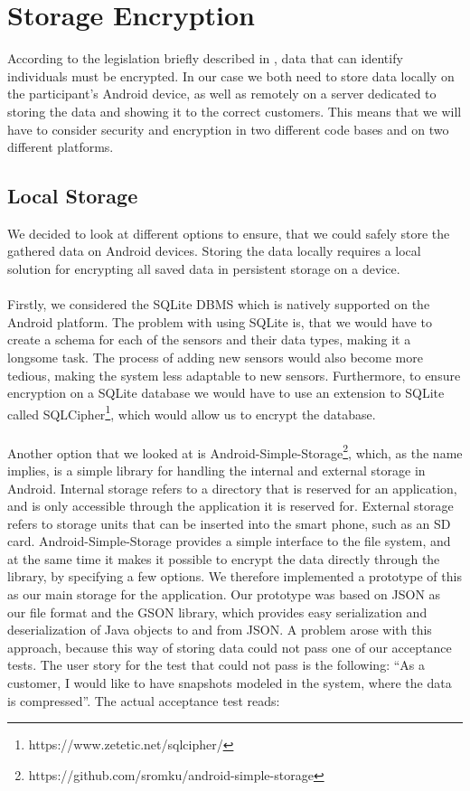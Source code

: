 
\section{Storage Encryption}
\label{sec:storage_encryption}
According to the legislation briefly described in , data that can identify individuals must be encrypted. In our case we both need to store data locally on the participant's Android device, as well as remotely on a server dedicated to storing the data and showing it to the correct customers. This means that we will have to consider security and encryption in two different code bases and on two different platforms. 

\subsection{Local Storage}
\label{sub:local_storage}
We decided to look at different options to ensure, that we could safely store the gathered data on Android devices. Storing the data locally requires a local solution for encrypting all saved data in persistent storage on a device. 
\\\\
Firstly, we considered the SQLite DBMS which is natively supported on the Android platform. The problem with using SQLite is, that we would have to create a schema for each of the sensors and their data types, making it a longsome task. The process of adding new sensors would also become more tedious, making the system less adaptable to new sensors. Furthermore, to ensure encryption on a SQLite database we would have to use an extension to SQLite called SQLCipher\footnote{https://www.zetetic.net/sqlcipher/}, which would allow us to encrypt the database. 
\\\\
Another option that we looked at is Android-Simple-Storage\footnote{https://github.com/sromku/android-simple-storage}, which, as the name implies, is a simple library for handling the internal and external storage in Android. Internal storage refers to a directory that is reserved for an application, and is only accessible through the application it is reserved for. External storage refers to storage units that can be inserted into the smart phone, such as an SD card. Android-Simple-Storage provides a simple interface to the file system, and at the same time it makes it possible to encrypt the data directly through the library, by specifying a few options. We therefore implemented a prototype of this as our main storage for the application. Our prototype was based on JSON as our file format and the GSON library, which provides easy serialization and deserialization of Java objects to and from JSON. A problem arose with this approach, because this way of storing data could not pass one of our acceptance tests. The user story for the test that could not pass is the following: ``As a customer, I would like to have snapshots modeled in the system, where the data is compressed''. The actual acceptance test reads:

